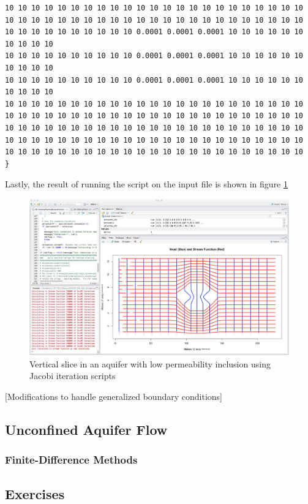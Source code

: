 \begin{lstlisting}[caption= Input file for 2D vertical slice confined aquifer with low permeability inclusion , label=lst:2DinclusionInput]
10 10 10 10 10 10 10 10 10 10 10 10 10 10 10 10 10 10 10 10 10 10 10
10 10 10 10 10 10 10 10 10 10 10 10 10 10 10 10 10 10 10 10 10 10 10
10 10 10 10 10 10 10 10 10 10 0.0001 0.0001 0.0001 10 10 10 10 10 10 10 10 10 10
10 10 10 10 10 10 10 10 10 10 0.0001 0.0001 0.0001 10 10 10 10 10 10 10 10 10 10
10 10 10 10 10 10 10 10 10 10 0.0001 0.0001 0.0001 10 10 10 10 10 10 10 10 10 10
10 10 10 10 10 10 10 10 10 10 10 10 10 10 10 10 10 10 10 10 10 10 10
10 10 10 10 10 10 10 10 10 10 10 10 10 10 10 10 10 10 10 10 10 10 10
10 10 10 10 10 10 10 10 10 10 10 10 10 10 10 10 10 10 10 10 10 10 10
10 10 10 10 10 10 10 10 10 10 10 10 10 10 10 10 10 10 10 10 10 10 10
10 10 10 10 10 10 10 10 10 10 10 10 10 10 10 10 10 10 10 10 10 10 10
}\end{lstlisting}

Lastly, the result of running the script on the input file is shown in figure \ref{fig:LowPInclusionOut}

\begin{figure}[h!] %
   \centering
   \includegraphics[width=5.2in]{./19-FlowNets/LowPInclusionOut.jpg} 
   \caption{Vertical slice in an aquifer with low permeability inclusion using Jacobi iteration scripts}
   \label{fig:LowPInclusionOut}
\end{figure}

[Modifications to handle generalized boundary conditions]



\clearpage
\subsection{Unconfined Aquifer Flow}
\subsubsection{Finite-Difference Methods}
\subsection{Exercises}
